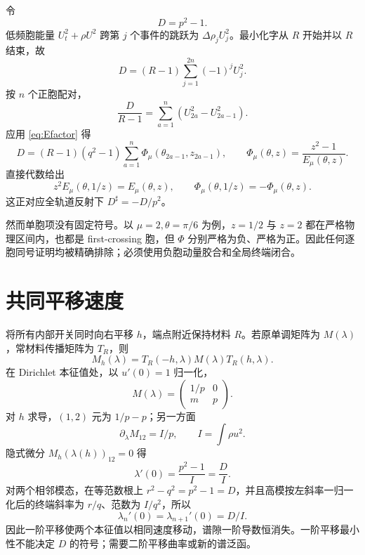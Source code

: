\documentclass[UTF8,12pt,openany,fontset=fandol]{ctexrep}
\theoremstyle{definition}
\begin{document}
令
\begin{equation}
 D=p^2-1.
\end{equation}
低频胞能量 $U_t^2+\rho U^2$ 跨第 $j$ 个事件的跳跃为 $\Delta\rho_jU_j^2$。最小化字从 $R$ 开始并以 $R$ 结束，故
\begin{equation}
 D=(R-1)\sum_{j=1}^{2n}(-1)^jU_j^2.
\end{equation}
按 $n$ 个正胞配对，
\begin{equation}
 \frac{D}{R-1}=\sum_{a=1}^n(U_{2a}^2-U_{2a-1}^2).
\end{equation}
应用 \eqref{eq:Efactor} 得
\begin{equation}\label{eq:defectsum}
 D=(R-1)(q^2-1)\sum_{a=1}^n
 \Phi_\mu(\theta_{2a-1},z_{2a-1}),\qquad
 \Phi_\mu(\theta,z)=\frac{z^2-1}{E_\mu(\theta,z)}.
\end{equation}
直接代数给出
\begin{equation}
 z^2E_\mu(\theta,1/z)=E_\mu(\theta,z),\qquad
 \Phi_\mu(\theta,1/z)=-\Phi_\mu(\theta,z).
\end{equation}
这正对应全轨道反射下 $D^\sharp=-D/p^2$。

然而单胞项没有固定符号。以 $\mu=2,\theta=\pi/6$ 为例，$z=1/2$ 与 $z=2$ 都在严格物理区间内，也都是 first-crossing 胞，但 $\Phi$ 分别严格为负、严格为正。因此任何逐胞同号证明均被精确排除；必须使用负胞动量胶合和全局终端闭合。

\section{共同平移速度}

将所有内部开关同时向右平移 $h$，端点附近保持材料 $R$。若原单调矩阵为 $M(\lambda)$，常材料传播矩阵为 $T_R$，则
\begin{equation}
 M_h(\lambda)=T_R(-h,\lambda)M(\lambda)T_R(h,\lambda).
\end{equation}
在 Dirichlet 本征值处，以 $u'(0)=1$ 归一化，
\begin{equation}
 M(\lambda)=\begin{pmatrix}1/p&0\\m&p\end{pmatrix}.
\end{equation}
对 $h$ 求导，$(1,2)$ 元为 $1/p-p$；另一方面
\begin{equation}
 \partial_\lambda M_{12}=I/p,\qquad I=\int\rho u^2.
\end{equation}
隐式微分 $M_h(\lambda(h))_{12}=0$ 得
\begin{equation}\label{eq:translationspeed}
 \lambda'(0)=\frac{p^2-1}{I}=\frac{D}{I}.
\end{equation}
对两个相邻模态，在等范数根上 $r^2-q^2=p^2-1=D$，并且高模按左斜率一归一化后的终端斜率为 $r/q$、范数为 $I/q^2$，所以
\begin{equation}
 \lambda_n'(0)=\lambda_{n+1}'(0)=D/I.
\end{equation}
因此一阶平移使两个本征值以相同速度移动，谱隙一阶导数恒消失。一阶平移最小性不能决定 $D$ 的符号；需要二阶平移曲率或新的谱泛函。
\end{document}
